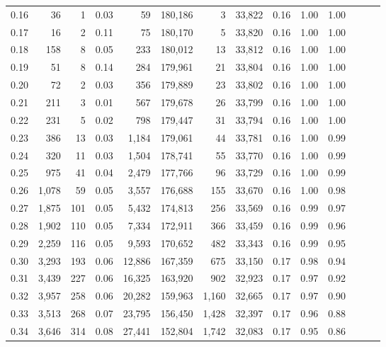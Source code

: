 \begin{tabular}{rrrrrrrrrrrrrr}
0.16 &     36 &      1 &  0.03 &       59 &  180,186 &       3 &  33,822 &  0.16 &  1.00 &      1.00 \\
0.17 &     16 &      2 &  0.11 &       75 &  180,170 &       5 &  33,820 &  0.16 &  1.00 &      1.00 \\
0.18 &    158 &      8 &  0.05 &      233 &  180,012 &      13 &  33,812 &  0.16 &  1.00 &      1.00 \\
0.19 &     51 &      8 &  0.14 &      284 &  179,961 &      21 &  33,804 &  0.16 &  1.00 &      1.00 \\
0.20 &     72 &      2 &  0.03 &      356 &  179,889 &      23 &  33,802 &  0.16 &  1.00 &      1.00 \\
0.21 &    211 &      3 &  0.01 &      567 &  179,678 &      26 &  33,799 &  0.16 &  1.00 &      1.00 \\
0.22 &    231 &      5 &  0.02 &      798 &  179,447 &      31 &  33,794 &  0.16 &  1.00 &      1.00 \\
0.23 &    386 &     13 &  0.03 &    1,184 &  179,061 &      44 &  33,781 &  0.16 &  1.00 &      0.99 \\
0.24 &    320 &     11 &  0.03 &    1,504 &  178,741 &      55 &  33,770 &  0.16 &  1.00 &      0.99 \\
0.25 &    975 &     41 &  0.04 &    2,479 &  177,766 &      96 &  33,729 &  0.16 &  1.00 &      0.99 \\
0.26 &  1,078 &     59 &  0.05 &    3,557 &  176,688 &     155 &  33,670 &  0.16 &  1.00 &      0.98 \\
0.27 &  1,875 &    101 &  0.05 &    5,432 &  174,813 &     256 &  33,569 &  0.16 &  0.99 &      0.97 \\
0.28 &  1,902 &    110 &  0.05 &    7,334 &  172,911 &     366 &  33,459 &  0.16 &  0.99 &      0.96 \\
0.29 &  2,259 &    116 &  0.05 &    9,593 &  170,652 &     482 &  33,343 &  0.16 &  0.99 &      0.95 \\
0.30 &  3,293 &    193 &  0.06 &   12,886 &  167,359 &     675 &  33,150 &  0.17 &  0.98 &      0.94 \\
0.31 &  3,439 &    227 &  0.06 &   16,325 &  163,920 &     902 &  32,923 &  0.17 &  0.97 &      0.92 \\
0.32 &  3,957 &    258 &  0.06 &   20,282 &  159,963 &   1,160 &  32,665 &  0.17 &  0.97 &      0.90 \\
0.33 &  3,513 &    268 &  0.07 &   23,795 &  156,450 &   1,428 &  32,397 &  0.17 &  0.96 &      0.88 \\
0.34 &  3,646 &    314 &  0.08 &   27,441 &  152,804 &   1,742 &  32,083 &  0.17 &  0.95 &      0.86 \\

\end{tabular}
